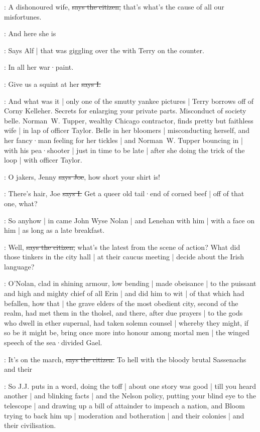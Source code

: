 \citizen:
A dishonoured wife,
\sout{says the citizen,}
that's what's the cause of all our misfortunes.

\bergan:
And here she is

\Nq:
Says Alf |
that was giggling over the 
with Terry on the counter.

\bergan:
In all her war·paint.

:
Give us a squint at her
\sout{says I.}

\Nq:
And what was it |
only one of the smutty yankee pictures |
Terry borrows off of Corny Kelleher.
Secrets for enlarging your private parts.
Misconduct of society belle.
Norman~W. Tupper,
wealthy Chicago contractor,
finds pretty but faithless wife |
in lap of officer Taylor.
Belle in her bloomers |
misconducting herself,
and her fancy·man feeling for her tickles |
and Norman~W. Tupper bouncing in |
with his pea·shooter |
just in time to be late |
after she doing the trick of the loop |
with officer Taylor.

\joe:
O jakers,
Jenny
\sout{says Joe},
how short your shirt is!

:
There's hair,
Joe
\sout{says I.}
Get a queer old tail·end of corned beef |
off of that one,
what?

\Nq:
So anyhow |
in came John Wyse Nolan |
and Lenehan with him |
with a face on him |
as long as a late breakfast.

\citizen:
Well,
\sout{says the citizen,}
what's the latest from the scene of action?
What did those tinkers in the city hall |
at their caucus meeting |
decide about the Irish language?

:
O'Nolan,
clad in shining armour,
low bending |
made obeisance |
to the puissant and high and mighty chief of all Erin |
and did him to wit |
of that which had befallen,
how that |
the grave elders of the most obedient city,
second of the realm,
had met them in the tholsel,
and there,
after due prayers |
to the gods who dwell in ether supernal,
had taken solemn counsel |
whereby they might,
if so be it might be,
bring once more into honour among mortal men |
the winged speech of the sea·divided Gael.

\citizen:
It's on the march,
\sout{says the citizen.}
To hell with the bloody brutal Sassenachs and their 

\Nq:
So J.J. puts in a word,
doing the toff |
about one story was good |
till you heard another |
and blinking facts |
and the Nelson policy,
putting your blind eye to the telescope |
and drawing up a bill of attainder to impeach a nation,
and Bloom trying to back him up |
moderation and botheration |
and their colonies |
and their civilisation.

